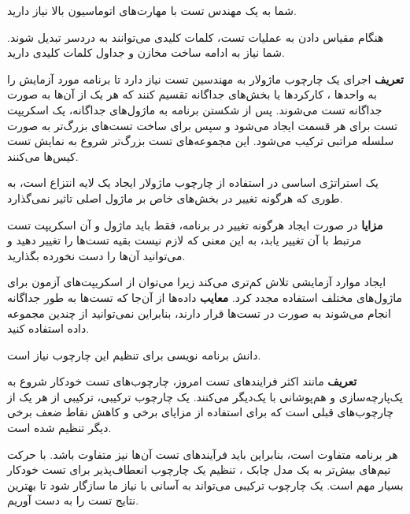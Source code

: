 	شما به یک مهندس تست با مهارت‌های اتوماسیون بالا نیاز دارید.
	
	هنگام مقیاس دادن به عملیات تست، کلمات کلیدی می‌توانند به دردسر تبدیل شوند. شما نیاز به ادامه ساخت مخازن و جداول کلمات کلیدی دارید.
	
	
	 
	
	\textbf{تعریف} 
	اجرای یک چارچوب ماژولار به مهندسین تست نیاز دارد تا برنامه مورد آزمایش را به واحدها ، کارکردها یا بخش‌های جداگانه تقسیم کنند که هر یک از آن‌ها به صورت جداگانه تست می‌شوند. پس از شکستن برنامه به ماژول‌های جداگانه، یک اسکریپت تست برای هر قسمت ایجاد می‌شود و سپس برای ساخت تست‌های بزرگ‌تر به صورت سلسله مراتبی ترکیب می‌شود. این مجموعه‌های تست بزرگ‌تر شروع به نمایش تست کیس‌ها می‌کنند.
	
	یک استراتژی اساسی در استفاده از چارچوب ماژولار ایجاد یک لایه انتزاع است، به طوری که هرگونه تغییر در بخش‌های خاص بر ماژول اصلی تاثیر نمی‌گذارد.
	
	
	\textbf{مزایا} 
	در صورت ایجاد هرگونه تغییر در برنامه، فقط باید ماژول و آن اسکریپت تست مرتبط با آن تغییر یابد، به این معنی که لازم نیست بقیه تست‌ها را تغییر دهید و می‌توانید آن‌ها را دست نخورده بگذارید.
	
	ایجاد موارد آزمایشی تلاش کم‌تری می‌کند زیرا می‌توان از اسکریپت‌های آزمون برای ماژول‌های مختلف استفاده مجدد کرد.
	\textbf{معایب}
	داده‌ها از آن‌جا که تست‌ها به طور جداگانه انجام می‌شوند  به صورت  در تست‌ها قرار دارند، بنابراین نمی‌توانید از چندین مجموعه داده استفاده کنید.
	
	دانش برنامه نویسی برای تنظیم این چارچوب نیاز است.
	
	

	
	 

\textbf{تعریف}
مانند اکثر فرایندهای تست امروز، چارچوب‌های تست خودکار شروع به یک‌پارچه‌سازی و هم‌پوشانی با یک‌دیگر می‌کنند. یک چارچوب ترکیبی، ترکیبی از هر یک از چارچوب‌های قبلی است که برای استفاده از مزایای برخی و کاهش نقاط ضعف برخی دیگر تنظیم شده است.

هر برنامه متفاوت است، بنابراین باید فرآیندهای تست آن‌ها نیز متفاوت باشد. با حرکت تیم‌های بیش‌تر به یک مدل چابک ، تنظیم یک چارچوب انعطاف‌پذیر برای تست خودکار بسیار مهم است. یک چارچوب ترکیبی می‌تواند به آسانی با نیاز ما سازگار شود تا بهترین نتایج تست را به دست آوریم.



